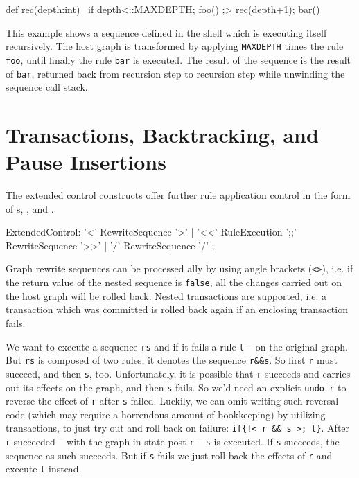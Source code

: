 \begin{example}
\label{ex:recseq}
\begin{grgen}
def rec(depth:int) {\
  if{ {depth<::MAXDEPTH}; foo() ;> rec(depth+1); bar() }\
}
\end{grgen}
This example shows a sequence defined in the shell which is executing itself recursively.
The host graph is transformed by applying \texttt{MAXDEPTH} times the rule \texttt{foo}, until finally the rule \texttt{bar} is executed. The result of the sequence is the result of \texttt{bar}, returned back from recursion step to recursion step while unwinding the sequence call stack. 
\end{example}


\section{Transactions, Backtracking, and Pause Insertions}\label{sec:extctrl}

The extended control constructs offer further rule application control in the form of s, , and .

\begin{rail} 
  ExtendedControl: 
    '<' RewriteSequence '>' | 
    '<<' RuleExecution ';;' RewriteSequence '>>' |
    '/' RewriteSequence '/'
	;
\end{rail}

Graph rewrite sequences can be processed ally by using angle brackets (\texttt{<>}), i.e.
if the return value of the nested sequence is \texttt{false}, all the changes carried out on the host graph will be rolled back.
Nested transactions\indexmainsee{nested transaction}{transaction} are supported, i.e. a transaction which was committed is rolled back again if an enclosing transaction fails.

\begin{example}
We want to execute a sequence \texttt{rs} and if it fails a rule \texttt{t} -- on the original graph. But \texttt{rs} is composed of two rules, it denotes the sequence \verb#r&&s#. So first \texttt{r} must succeed, and then \texttt{s}, too. Unfortunately, it is possible that \texttt{r} succeeds and carries out its effects on the graph, and then \texttt{s} fails. So we'd need an explicit \texttt{undo-r} to reverse the effect of \texttt{r} after \texttt{s} failed. Luckily, we can omit writing such reversal code (which may require a horrendous amount of bookkeeping) by utilizing transactions, to just try out and roll back on failure: \verb#if{!< r && s >; t}#. After \texttt{r} succeeded -- with the graph in state post-\texttt{r} -- \texttt{s} is executed. If \texttt{s} succeeds, the sequence as such succeeds. But if \texttt{s} fails we just roll back the effects of \texttt{r} and execute \texttt{t} instead. 
\end{example}

